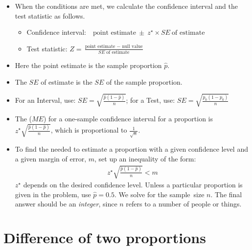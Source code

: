 \begin{itemize}
\item When the conditions are met, we calculate the confidence interval and the test statistic as follows.
\begin{itemize}
\item[] Confidence interval:\ \  $\text{point estimate}\ \pm\ z^{\star} \times SE\ \text{of estimate}$
\item[] Test statistic: $Z = \frac{\text{point estimate } - \text{ null value}}{SE \text{ of estimate}}$ 
\end{itemize}
\item[] Here the point estimate is the sample proportion $\hat{p}$.
\item[] The $SE$ of estimate is the $SE$ of the sample proportion.  
\item[] \quad \quad  For an Interval, use:  $SE = \sqrt{\frac{\hat{p}(1-\hat{p})}{n}}$;  \quad for a Test, use:   $SE = \sqrt{\frac{p_0(1-p_0)}{n}}$

\item The  ($ME$) for a one-sample confidence interval for a proportion is $z^{\star}\sqrt{\frac{\hat{p}(1-\hat{p})}{n}}$, which is proportional to $\frac{1}{\sqrt{n}}$.  

\item To find the  needed to estimate a proportion with a given confidence level and a given margin of error, $m$, set up an inequality of the form:
\begin{align*}
z^{\star}\sqrt{\frac{\hat{p}(1-\hat{p})}{n}}<m
\end{align*}
$z^{\star}$ depends on the desired confidence level.  Unless a particular proportion is given in the problem, use \mbox{$\hat{p}=0.5$.}  We solve for the sample~size $n$.  The final answer should be an \textit{integer}, since $n$ refers to a number of people or things.
\end{itemize}


{}



\section[Difference of two proportions]{Difference of two proportions }
\label{differenceOfTwoProportions}

